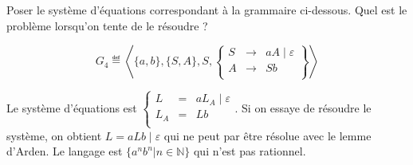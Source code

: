 
\begingroup

\begin{exercice}\label{exo:parsing/rational/revision}

  \begin{questions}
  \item Poser le système d'équations correspondant à la grammaire ci-dessous. Quel est le problème lorsqu'on tente de le résoudre ?

    $$G_4 \eqdef \left\langle\{a, b\}, \{S, A\}, S, \left\{
    \begin{array}{lll}
      S   &\rightarrow& a A \mid \varepsilon \\
      A   &\rightarrow& S b\\
    \end{array}\right\}\right\rangle$$
  \end{questions}

\end{exercice}

\begin{corrections}

  \begin{questions}
  \item Le système d'équations est $\left\{\begin{array}{lll}
    L   &=& a L_A \mid \varepsilon \\
    L_A   &=& L b\\
  \end{array}\right.$.
    Si on essaye de résoudre le système, on obtient $L = a L b \mid \varepsilon$ qui ne peut par être résolue avec le lemme d'Arden.
    Le langage est $\{a^n b^n | n\in \mathbb{N}\}$ qui n'est pas rationnel. 
  \end{questions}
  
\end{corrections}

\endgroup
\endinput
